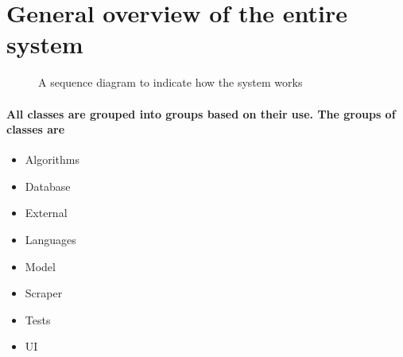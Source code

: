 \documentclass[11pt,a4paper]{article}
\begin{document}
\section{General overview of the entire system}

\begin{figure}[H]
  \caption{A sequence diagram to indicate how the system works}
  \label{fig:sequencediagram}
\end{figure}

\paragraph{All classes are grouped into groups based on their use. The groups of
classes are}
\begin{itemize}
\item Algorithms
\item Database
\item External
\item Languages
\item Model
\item Scraper
\item Tests 
\item UI
\end{itemize}
\end{document}
